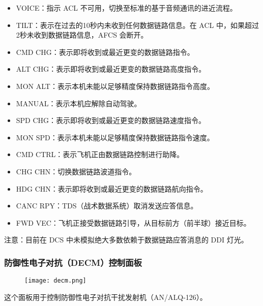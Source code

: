 \begin{itemize}
	\item VOICE：指示 ACL 不可用，切换至标准的基于音频通讯的进近流程。
	\item TILT：表示在过去的10秒内未收到任何数据链路信息。在 ACL 中，如果超过2秒未收到数据链路信息，AFCS 会断开。
	\item CMD CHG：表示即将收到或最近更变的数据链路指令。
	\item ALT CHG：表示即将收到或最近更变的数据链路高度指令。
	\item MON ALT：表示本机未能以足够精度保持数据链路指令高度。
	\item MANUAL：表示本机应解除自动驾驶。
	\item SPD CHG：表示即将收到或最近更变的数据链路速度指令。
	\item MON SPD：表示本机未能以足够精度保持数据链路指令速度。
	\item CMD CTRL：表示飞机正由数据链路控制进行助降。
	\item CHG CHN：切换数据链路波道指令。
	\item HDG CHN：表示即将收到或最近更变的数据链路航向指令。
	\item CANC RPY：TDS（战术数据系统）取消发送应答信息。
	\item FWD VEC：飞机正接受数据链路引导，从目标前方（前半球）接近目标。
\end{itemize}
注意：目前在 DCS 中未模拟绝大多数依赖于数据链路应答消息的 DDI 灯光。

\subsubsection{防御性电子对抗（DECM）控制面板}
\begin{figure}[htb]
	\centering
	\texttt{[image: decm.png]}
\end{figure}
这个面板用于控制防御性电子对抗干扰发射机（AN/ALQ-126）。

